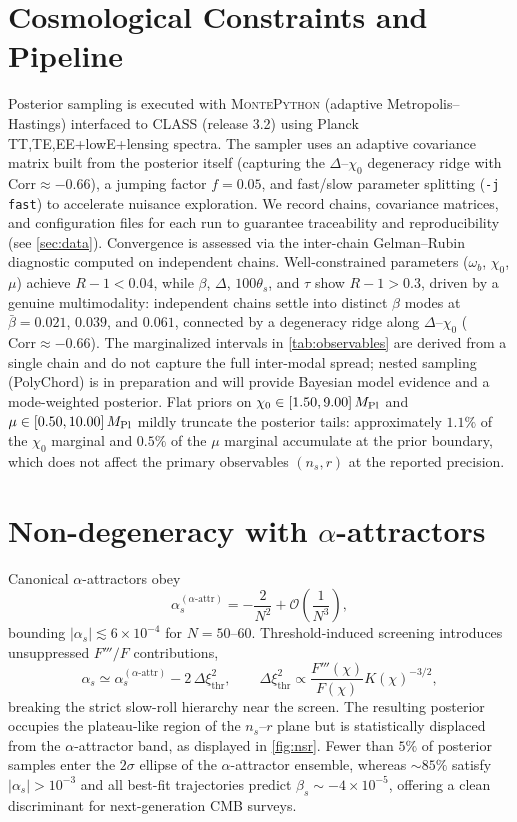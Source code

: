 \documentclass[11pt,a4paper]{article}
\begin{document}
\section{Cosmological Constraints and Pipeline}
\label{sec:constraints}
Posterior sampling is executed with \textsc{MontePython} (adaptive Metropolis--Hastings) interfaced to \textsc{CLASS} (release 3.2) using Planck TT,TE,EE+lowE+lensing spectra. The sampler uses an adaptive covariance matrix built from the posterior itself (capturing the $\Delta$--$\chi_0$ degeneracy ridge with $\mathrm{Corr}\approx-0.66$), a jumping factor $f=0.05$, and fast/slow parameter splitting (\texttt{-j fast}) to accelerate nuisance exploration. We record chains, covariance matrices, and configuration files for each run to guarantee traceability and reproducibility (see \cref{sec:data}). Convergence is assessed via the inter-chain Gelman--Rubin diagnostic computed on independent chains. Well-constrained parameters ($\omega_b$, $\chi_0$, $\mu$) achieve $R{-}1<0.04$, while $\beta$, $\Delta$, $100\theta_s$, and $\tau$ show $R{-}1>0.3$, driven by a genuine multimodality: independent chains settle into distinct $\beta$ modes at $\bar\beta=0.021$, $0.039$, and $0.061$, connected by a degeneracy ridge along $\Delta$--$\chi_0$ ($\mathrm{Corr}\approx-0.66$). The marginalized intervals in \cref{tab:observables} are derived from a single chain and do not capture the full inter-modal spread; nested sampling (PolyChord) is in preparation and will provide Bayesian model evidence and a mode-weighted posterior. Flat priors on $\chi_0\in[1.50,9.00]\,M_{\rm Pl}$ and $\mu\in[0.50,10.00]\,M_{\rm Pl}$ mildly truncate the posterior tails: approximately $1.1\%$ of the $\chi_0$ marginal and $0.5\%$ of the $\mu$ marginal accumulate at the prior boundary, which does not affect the primary observables $(n_s,r)$ at the reported precision.

\section{Non-degeneracy with $\alpha$-attractors}
\label{sec:nondegeneracy}
Canonical $\alpha$-attractors obey
\begin{equation}
\alpha_{s}^{(\alpha\text{-attr})}=-\frac{2}{N^{2}}+\mathcal{O}\left(\frac{1}{N^{3}}\right),
\end{equation}
bounding $|\alpha_{s}|\lesssim6\times10^{-4}$ for $N=50$--60. Threshold-induced screening introduces unsuppressed $F'''/F$ contributions,
\begin{equation}
\alpha_{s}\simeq \alpha_{s}^{(\alpha\text{-attr})}-2\,\Delta\xi_{\text{thr}}^{2}, \qquad \Delta\xi_{\text{thr}}^{2}\propto\frac{F'''(\chi)}{F(\chi)}K(\chi)^{-3/2},
\end{equation}
breaking the strict slow-roll hierarchy near the screen. The resulting posterior occupies the plateau-like region of the $n_{s}$--$r$ plane but is statistically displaced from the $\alpha$-attractor band, as displayed in \cref{fig:nsr}. Fewer than $5\%$ of posterior samples enter the $2\sigma$ ellipse of the $\alpha$-attractor ensemble, whereas ${\sim}85\%$ satisfy $|\alpha_{s}|>10^{-3}$ and all best-fit trajectories predict $\beta_{s}\sim -4\times10^{-5}$, offering a clean discriminant for next-generation CMB surveys.
\end{document}
